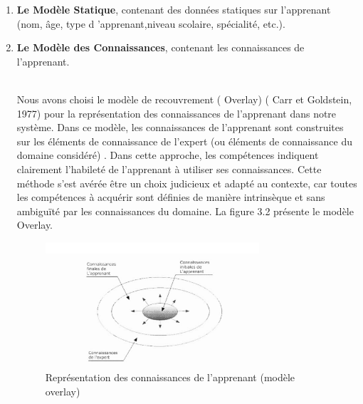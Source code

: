\begin{enumerate}
\item  \textbf{Le Modèle Statique}, contenant des données statiques sur l'apprenant (nom, âge, type d 'apprenant,niveau scolaire, spécialité,  etc.).
\item  \textbf{Le Modèle des Connaissances}, contenant les connaissances de l'apprenant.\\\

Nous avons choisi le modèle de recouvrement ( Overlay) ( Carr et Goldstein, 1977) pour la représentation des connaissances de l'apprenant dans notre système. Dans ce modèle, les connaissances de l'apprenant sont construites sur les éléments de connaissance de l'expert (ou éléments de connaissance du domaine considéré) . Dans cette approche, les compétences indiquent clairement l'habileté de l'apprenant à utiliser ses connaissances. Cette méthode s'est avérée être un choix judicieux et adapté au contexte, car toutes les compétences à acquérir sont définies de manière intrinsèque et sans ambiguïté par les connaissances du domaine. La figure 3.2 présente le modèle Overlay. 

\begin{figure}
    \includegraphics[width=0.75\textwidth]{figures/con1.PNG}
    \captionsetup{justification=centering}
    \caption{Représentation des connaissances de l'apprenant (modèle overlay)}
 \label{fig:2}
\end{figure}
\\\


\end{enumerate}

